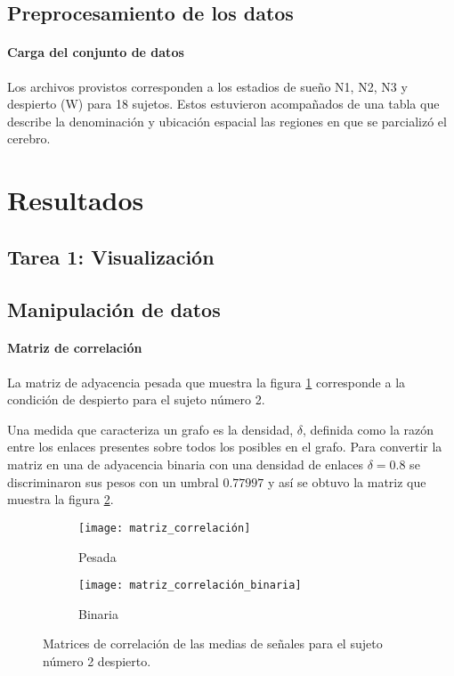 \documentclass{article}
\begin{document}
\subsection{Preprocesamiento de los datos}

\paragraph{Carga del conjunto de datos} 
Los archivos provistos corresponden a los estadios de sueño N1, N2, N3 y despierto (W) para 18 sujetos.
Estos estuvieron acompañados de una tabla que describe la denominación y  ubicación espacial las regiones en que se parcializó el cerebro.



\section{Resultados}

\subsection{Tarea 1: Visualización}


\subsection{Manipulación de datos}

\paragraph{Matriz de correlación}
La matriz de adyacencia pesada que muestra la figura \ref{fg:matriz_correlación_pesada} corresponde a la condición de despierto para el sujeto número 2.

Una medida que caracteriza un grafo es la densidad, $\delta$, definida como la razón entre los enlaces presentes sobre todos los posibles en el grafo.
Para convertir la matriz en una de adyacencia binaria con una densidad de enlaces \(\delta = 0.8\) se discriminaron sus pesos con un umbral \(0.77997\) y así se obtuvo la matriz que muestra la figura \ref{fg:matriz_correlación_binaria}.

\begin{figure}[ht]
	\centering
	\begin{subfigure}[b]{0.3\textwidth}
		\texttt{[image: matriz\_correlación]}
		\caption{Pesada}
		\label{fg:matriz_correlación_pesada}
	\end{subfigure}
	\begin{subfigure}[b]{0.25\textwidth}
		\texttt{[image: matriz\_correlación\_binaria]}
		\caption{Binaria}
		\label{fg:matriz_correlación_binaria}
	\end{subfigure}
	\caption{Matrices de correlación de las medias de señales para el sujeto número 2 despierto. 
	}
	\label{fg:matriz_correlación}
\end{figure}
\end{document}
